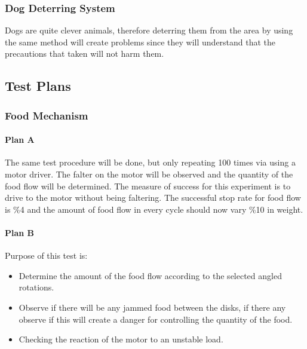 \subsubsection{Dog Deterring System}
Dogs are quite clever animals, therefore deterring them from the area by using the same method will create problems since they will understand that the precautions that taken will not harm them.

\subsection{Test Plans}
\subsubsection{Food Mechanism}
\paragraph{Plan A}
The same test procedure will be done, but only repeating 100 times via using a motor driver. The falter on the motor will be observed and the quantity of the food flow will be determined.
The measure of success for this experiment is to drive to the motor without being faltering. The successful stop rate for food flow is \%4 and the amount of food flow in every cycle should now vary \%10 in weight.

\paragraph{Plan B}
Purpose of this test is:
\begin{itemize}
    \item Determine the amount of the food flow according to the selected angled rotations. 
    \item Observe if there will be any jammed food between the disks, if there any observe if this will create a danger for controlling the quantity of the food. 
    \item Checking the reaction of the motor to an unstable load.
\end{itemize}

